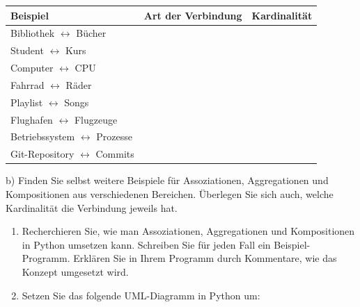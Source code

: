 \documentclass[11pt, a4paper, oneside]{article}
\begin{document}
	\begin{table}[h!]
		\begin{tabularx}{\textwidth}{|l|X|l|}
			\hline
			\textbf{Beispiel} & \textbf{Art der Verbindung} & \textbf{Kardinalität}\\
			\hline
			\hline
			Bibliothek $\longleftrightarrow$ Bücher &&\\
			\hline
			Student $\longleftrightarrow$ Kurs &&\\
			\hline
			Computer $\longleftrightarrow$ CPU &&\\
			\hline
			Fahrrad $\longleftrightarrow$ Räder &&\\
			\hline
			Playlist $\longleftrightarrow$ Songs &&\\
			\hline
			Flughafen $\longleftrightarrow$ Flugzeuge &&\\
			\hline
			Betriebssystem $\longleftrightarrow$ Prozesse &&\\
			\hline
			Git-Repository $\longleftrightarrow$ Commits &&\\
			\hline
		\end{tabularx}
	\end{table}
	
	b) Finden Sie selbst weitere Beispiele für Assoziationen, Aggregationen und Kompositionen aus verschiedenen Bereichen.
	Überlegen Sie sich auch, welche Kardinalität die Verbindung jeweils hat.
	
	
	\begin{enumerate}[label=\alph*)]
		\item Recherchieren Sie, wie man Assoziationen, Aggregationen und Kompositionen in Python umsetzen kann.
		Schreiben Sie für jeden Fall ein Beispiel-Programm.
		Erklären Sie in Ihrem Programm durch Kommentare, wie das Konzept umgesetzt wird.
		
		\item Setzen Sie das folgende UML-Diagramm in Python um:
		\begin{figure}[h!]
			\centering
		\end{figure}
	\end{enumerate}
	
\end{document}
